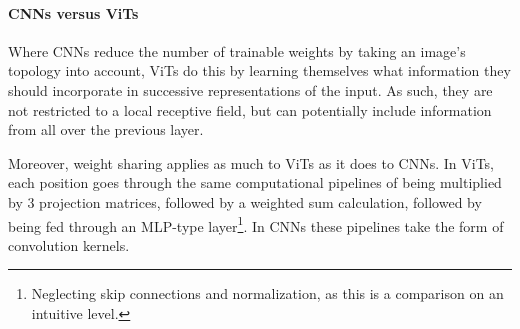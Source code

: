 





\paragraph{CNNs versus ViTs}
Where CNNs reduce the number of trainable weights by taking an image's topology into account, ViTs do this by learning themselves what information they should incorporate in successive representations of the input. As such, they are not restricted to a local receptive field, but can potentially include information from all over the previous layer.

Moreover, weight sharing applies as much to ViTs as it does to CNNs. In ViTs, each position goes through the same computational pipelines of being multiplied by 3 projection matrices, followed by a weighted sum calculation, followed by being fed through an MLP-type layer\footnote{Neglecting skip connections and normalization, as this is a comparison on an intuitive level.}. In CNNs these pipelines take the form of convolution kernels.

